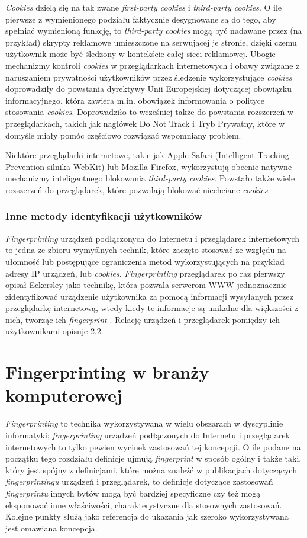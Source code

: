 \emph{Cookies} dzielą się na tak zwane \emph{first-party cookies} i
\emph{third-party cookies}. O ile pierwsze z wymienionego podziału faktycznie
desygnowane są do tego, aby spełniać wymienioną funkcję, to \emph{third-party
cookies} mogą być nadawane przez (na przykład) skrypty reklamowe umieszczone na
serwującej je stronie, dzięki czemu użytkownik może być śledzony w kontekście
całej sieci reklamowej. Ubogie mechanizmy kontroli \emph{cookies} w
przeglądarkach internetowych i obawy związane z naruszaniem prywatności
użytkowników przez śledzenie wykorzystujące \emph{cookies} doprowadziły do
powstania dyrektywy Unii Europejskiej dotyczącej obowiązku informacyjnego, która
zawiera m.in. obowiązek informowania o polityce stosowania \emph{cookies}.
Doprowadziło to wcześniej także do powstania rozszerzeń w przeglądarkach, takich
jak nagłówek Do Not Track i Tryb Prywatny, które w domyśle miały pomóc częściowo
rozwiązać wspomniany problem.

Niektóre przeglądarki internetowe, takie jak Apple Safari (Intelligent Tracking
Prevention silnika WebKit) lub Mozilla Firefox, wykorzystują obecnie natywne
mechanizmy inteligentnego blokowania \emph{third-party cookies}. Powstało także
wiele rozszerzeń do przeglądarek, które pozwalają blokować niechciane
\emph{cookies}.

\subsubsection{Inne metody identyfikacji użytkowników}
\emph{Fingerprinting} urządzeń podłączonych do Internetu i przeglądarek
internetowych to jedna ze zbioru wymyślnych technik, które zaczęto stosować ze
względu na ułomność lub postępujące ograniczenia metod wykorzystujących na
przykład adresy IP urządzeń, lub \emph{cookies}. \emph{Fingerprinting}
przeglądarek po raz pierwszy opisał Eckersley jako technikę, która pozwala
serwerom WWW jednoznacznie zidentyfikować urządzenie użytkownika za pomocą
informacji wysyłanych przez przeglądarkę internetową, wtedy kiedy te informacje
są unikalne dla większości z nich, tworząc ich \emph{fingerprint}
\cite{eckersley2010unique}. Relację urządzeń i przeglądarek pomiędzy ich
użytkownikami opisuje 2.2.

\section{Fingerprinting w branży komputerowej}
\emph{Fingerprinting} to technika wykorzystywana w wielu obszarach w dyscyplinie
informatyki; \emph{fingerprinting} urządzeń podłączonych do Internetu i
przeglądarek internetowych to tylko pewien wycinek zastosowań tej koncepcji. O
ile podane na początku tego rozdziału definicje ujmują \emph{fingerprint} w
sposób ogólny i także taki, który jest spójny z definicjami, które można znaleźć
w publikacjach dotyczących \emph{fingerprintingu} urządzeń i przeglądarek, to
definicje dotyczące zastosowań \emph{fingerprintu} innych bytów mogą być
bardziej specyficzne czy też mogą eksponować inne właściwości, charakterystyczne
dla stosownych zastosowań. Kolejne punkty służą jako referencja do ukazania jak
szeroko wykorzystywana jest omawiana koncepcja.


